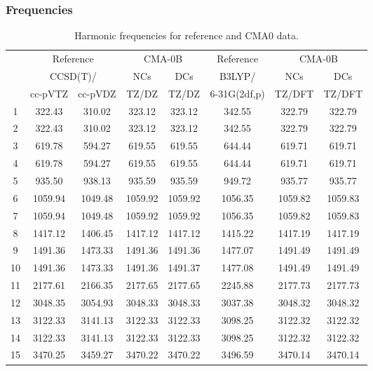 \documentclass[10pt,oneside]{article}
\begin{document}
\subsubsection*{Frequencies}
\begin{table}[h!]
\centering
\caption{Harmonic frequencies for reference and CMA0 data.}
\begin{tabular}{cccccccc}
\toprule
{} & \multicolumn{2}{c}{Reference} & \multicolumn{2}{c}{CMA-0B} &    Reference & \multicolumn{2}{c}{CMA-0B} \\
{} & \multicolumn{2}{c}{CCSD(T)/} &     NCs &     DCs &       B3LYP/ &     NCs &     DCs \\
{} &   cc-pVTZ & cc-pVDZ &   TZ/DZ &   TZ/DZ & 6-31G(2df,p) &  TZ/DFT &  TZ/DFT \\
\midrule
1  &    322.43 &  310.02 &  323.12 &  323.12 &       342.55 &  322.79 &  322.79 \\
2  &    322.43 &  310.02 &  323.12 &  323.12 &       342.55 &  322.79 &  322.79 \\
3  &    619.78 &  594.27 &  619.55 &  619.55 &       644.44 &  619.71 &  619.71 \\
4  &    619.78 &  594.27 &  619.55 &  619.55 &       644.44 &  619.71 &  619.71 \\
5  &    935.50 &  938.13 &  935.59 &  935.59 &       949.72 &  935.77 &  935.77 \\
6  &   1059.94 & 1049.48 & 1059.92 & 1059.92 &      1056.35 & 1059.82 & 1059.83 \\
7  &   1059.94 & 1049.48 & 1059.92 & 1059.92 &      1056.35 & 1059.82 & 1059.83 \\
8  &   1417.12 & 1406.45 & 1417.12 & 1417.12 &      1415.22 & 1417.19 & 1417.19 \\
9  &   1491.36 & 1473.33 & 1491.36 & 1491.36 &      1477.07 & 1491.49 & 1491.49 \\
10 &   1491.36 & 1473.33 & 1491.36 & 1491.37 &      1477.08 & 1491.49 & 1491.49 \\
11 &   2177.61 & 2166.35 & 2177.65 & 2177.65 &      2245.88 & 2177.73 & 2177.73 \\
12 &   3048.35 & 3054.93 & 3048.33 & 3048.33 &      3037.38 & 3048.32 & 3048.32 \\
13 &   3122.33 & 3141.13 & 3122.33 & 3122.33 &      3098.25 & 3122.32 & 3122.32 \\
14 &   3122.33 & 3141.13 & 3122.33 & 3122.33 &      3098.25 & 3122.32 & 3122.32 \\
15 &   3470.25 & 3459.27 & 3470.22 & 3470.22 &      3496.59 & 3470.14 & 3470.14 \\
\bottomrule
\end{tabular}
\end{table}
\end{document}
